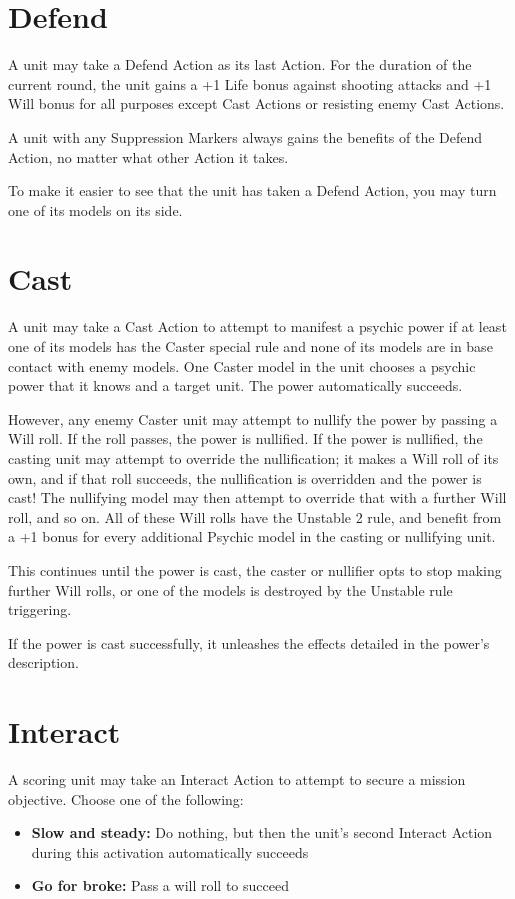 \begin{multicols}{2}
\section*{Defend}
A unit may take a Defend Action as its last Action. For the duration of the current round, the unit gains a +1 Life bonus against shooting attacks and +1 Will bonus for all purposes except Cast Actions or resisting enemy Cast Actions.

A unit with any Suppression Markers always gains the benefits of the Defend Action, no matter what other Action it takes.

To make it easier to see that the unit has taken a Defend Action, you may turn one of its models on its side.




\section*{Cast}
A unit may take a Cast Action to attempt to manifest a psychic power if at least one of its models has the Caster special rule and none of its models are in base contact with enemy models. One Caster model in the unit chooses a psychic power that it knows and a target unit. The power automatically succeeds.

However, any enemy Caster unit may attempt to nullify the power by passing a Will roll. If the roll passes, the power is nullified. If the power is nullified, the casting unit may attempt to override the nullification; it makes a Will roll of its own, and if that roll succeeds, the nullification is overridden and the power is cast! The nullifying model may then attempt to override that with a further Will roll, and so on. All of these Will rolls have the Unstable 2 rule, and benefit from a +1 bonus for every additional Psychic model in the casting or nullifying unit.

This continues until the power is cast, the caster or nullifier opts to stop making further Will rolls, or one of the models is destroyed by the Unstable rule triggering.

If the power is cast successfully, it unleashes the effects detailed in the power's description.




\section*{Interact}
A scoring unit may take an Interact Action to attempt to secure a mission objective. Choose one of the following:
\begin{itemize}
    \item \textbf{Slow and steady:} Do nothing, but then the unit's second Interact Action during this activation automatically succeeds
    \item \textbf{Go for broke:} Pass a will roll to succeed
\end{itemize}


\end{multicols}

